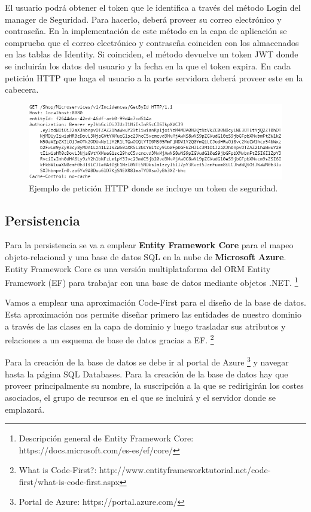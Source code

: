 \documentclass[11pt,spanish,listoffigures]{tfgetsinf}
\begin{document}
El usuario podrá obtener el token que le identifica a través del método Login del manager de Seguridad. Para hacerlo, deberá proveer su correo electrónico y contraseña. En la implementación de este método en la capa de aplicación se comprueba que el correo electrónico y contraseña coinciden con los almacenados en las tablas de Identity. Si coinciden, el método devuelve un token JWT donde se incluirán los datos del usuario y la fecha en la que el token expira. En cada petición HTTP que haga el usuario a la parte servidora deberá proveer este en la cabecera.

\begin{figure}[h]
\centering
\includegraphics[scale=0.8]{http}
\caption{Ejemplo de petición HTTP donde se incluye un token de seguridad.}
\end{figure}

\newpage

\subsection{Persistencia} \label{subsect:Persistencia}

Para la persistencia se va a emplear \textbf{Entity Framework Core} para el mapeo objeto-relacional y una base de datos SQL en la nube de \textbf{Microsoft Azure}. Entity Framework Core es una versión multiplataforma del ORM Entity Framework (EF) para trabajar con una base de datos mediante objetos .NET. \footnote{Descripción general de Entity Framework Core: https://docs.microsoft.com/es-es/ef/core/}

Vamos a emplear una aproximación Code-First para el diseño de la base de datos. Esta aproximación nos permite diseñar primero las entidades de nuestro dominio a través de las clases en la capa de dominio y luego trasladar sus atributos y relaciones a un esquema de base de datos gracias a EF. \footnote{What is Code-First?: http://www.entityframeworktutorial.net/code-first/what-is-code-first.aspx}

Para la creación de la base de datos se debe ir al portal de Azure \footnote{ Portal de Azure: https://portal.azure.com/} y navegar hasta la página SQL Databases. Para la creación de la base de datos hay que proveer principalmente su nombre, la suscripción a la que se redirigirán los costes asociados, el grupo de recursos en el que se incluirá y el servidor donde se emplazará.
\end{document}
